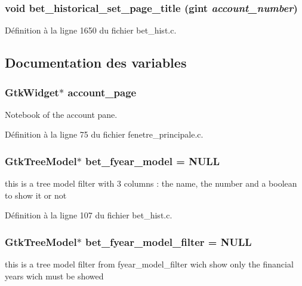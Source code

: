 \subsubsection[{bet\_\-historical\_\-set\_\-page\_\-title}]{\setlength{\rightskip}{0pt plus 5cm}void bet\_\-historical\_\-set\_\-page\_\-title (gint {\em account\_\-number})}\label{bet__hist_8c_aa39deaae836fcf9b62acc430d95e1479}


Définition à la ligne 1650 du fichier bet\_\-hist.c.



\subsection{Documentation des variables}
\subsubsection[{account\_\-page}]{\setlength{\rightskip}{0pt plus 5cm}GtkWidget$\ast$ {\bf account\_\-page}}\label{bet__hist_8c_ad5443d986a9ab5d64dd84c5346c4b87c}
Notebook of the account pane. 

Définition à la ligne 75 du fichier fenetre\_\-principale.c.

\subsubsection[{bet\_\-fyear\_\-model}]{\setlength{\rightskip}{0pt plus 5cm}GtkTreeModel$\ast$ {\bf bet\_\-fyear\_\-model} = NULL}\label{bet__hist_8c_a3b7bcf1e9b05e7a812d6f4d4bc0627d6}
this is a tree model filter with 3 columns : the name, the number and a boolean to show it or not 

Définition à la ligne 107 du fichier bet\_\-hist.c.

\subsubsection[{bet\_\-fyear\_\-model\_\-filter}]{\setlength{\rightskip}{0pt plus 5cm}GtkTreeModel$\ast$ {\bf bet\_\-fyear\_\-model\_\-filter} = NULL}\label{bet__hist_8c_aecc63d6768ce86bba48badbe50334f1b}
this is a tree model filter from fyear\_\-model\_\-filter wich show only the financial years wich must be showed 

